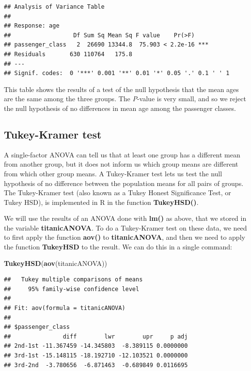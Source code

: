 \documentclass[
]{article}
\newenvironment{Shaded}{\begin{snugshade}}{\end{snugshade}}
\newcommand{\FunctionTok}[1]{\textcolor[rgb]{0.13,0.29,0.53}{\textbf{#1}}}
\newcommand{\NormalTok}[1]{#1}
\begin{document}
\begin{verbatim}
## Analysis of Variance Table
## 
## Response: age
##                  Df Sum Sq Mean Sq F value    Pr(>F)    
## passenger_class   2  26690 13344.8  75.903 < 2.2e-16 ***
## Residuals       630 110764   175.8                      
## ---
## Signif. codes:  0 '***' 0.001 '**' 0.01 '*' 0.05 '.' 0.1 ' ' 1
\end{verbatim}

This table shows the results of a test of the null hypothesis that the
mean ages are the same among the three groups. The \emph{P}-value is
very small, and so we reject the null hypothesis of no differences in
mean age among the passenger classes.

\subsection{Tukey-Kramer test}\label{tukey-kramer-test}

A single-factor ANOVA can tell us that at least one group has a
different mean from another group, but it does not inform us which group
means are different from which other group means. A Tukey-Kramer test
lets us test the null hypothesis of no difference between the population
means for all pairs of groups. The Tukey-Kramer test (also known as a
Tukey Honest Significance Test, or Tukey HSD), is implemented in R in
the function \textbf{TukeyHSD()}.

We will use the results of an ANOVA done with \textbf{lm()} as above,
that we stored in the variable \textbf{titanicANOVA}. To do a
Tukey-Kramer test on these data, we need to first apply the function
\textbf{aov()} to \textbf{titanicANOVA}, and then we need to apply the
function \textbf{TukeyHSD} to the result. We can do this in a single
command:

\begin{Shaded}
\begin{Highlighting}[]
\FunctionTok{TukeyHSD}\NormalTok{(}\FunctionTok{aov}\NormalTok{(titanicANOVA))}
\end{Highlighting}
\end{Shaded}

\begin{verbatim}
##   Tukey multiple comparisons of means
##     95% family-wise confidence level
## 
## Fit: aov(formula = titanicANOVA)
## 
## $passenger_class
##               diff        lwr        upr     p adj
## 2nd-1st -11.367459 -14.345803  -8.389115 0.0000000
## 3rd-1st -15.148115 -18.192710 -12.103521 0.0000000
## 3rd-2nd  -3.780656  -6.871463  -0.689849 0.0116695
\end{verbatim}
\end{document}
